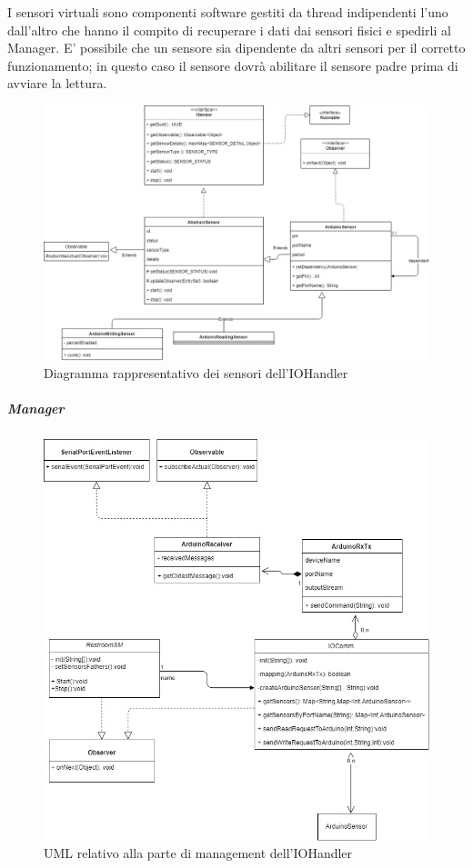 \documentclass[12pt]{article}
\begin{document}
I sensori virtuali sono componenti software gestiti da thread indipendenti l'uno dall'altro che hanno il compito di recuperare i dati dai sensori fisici e spedirli al Manager.
E' possibile che un sensore sia dipendente da altri sensori per il corretto funzionamento; in questo caso il sensore dovrà abilitare il sensore padre prima di avviare la lettura.
\begin{figure}[h!]
\centering
	\includegraphics[scale=0.43]{img/parteLocale/SoftwareSensorsRaspberry.png}  
    \caption{Diagramma rappresentativo dei sensori dell'IOHandler}
\end{figure}
\newpage
\subparagraph{Manager}
\begin{figure}[h!]
\centering
	\includegraphics[scale=0.55]{img/parteLocale/UmlManager.png}  
    \caption{UML relativo alla parte di management dell'IOHandler}
\end{figure}
\end{document}
